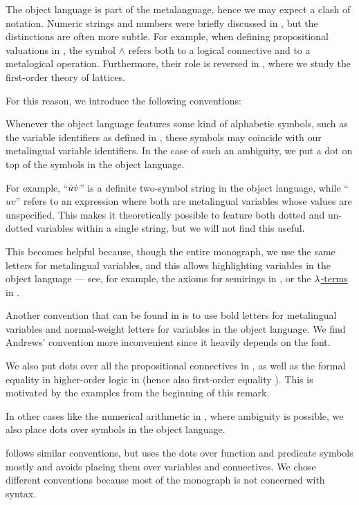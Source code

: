 \begin{remark}\label{rem:object_language_dots}
  The object language is part of the metalanguage, hence we may expect a clash of notation. Numeric strings and numbers were briefly discussed in , but the distinctions are often more subtle. For example, when defining propositional valuations in , the symbol \( \wedge \) refers both to a logical connective and to a metalogical operation. Furthermore, their role is reversed in , where we study the first-order theory of lattices.

  For this reason, we introduce the following conventions:
  \begin{thmenum}
     Whenever the object language features some kind of alphabetic symbols, such as the variable identifiers as defined in , these symbols may coincide with our metalingual variable identifiers. In the case of such an ambiguity, we put a dot on top of the symbols in the object language.

    For example, \enquote{\( \dot{u} \dot{v} \)} is a definite two-symbol string in the object language, while \enquote{\( uv \)} refers to an expression where both are metalingual variables whose values are unspecified. This makes it theoretically possible to feature both dotted and un-dotted variables within a single string, but we will not find this useful.

    This becomes helpful because, though the entire monograph, we use the same letters for metalingual variables, and this allows highlighting variables in the object language --- see, for example, the axioms for semirings in , or the \hyperref[def:lambda_term]{\( {\mathrm \lambda} \)-terms} in .

    Another convention that can be found in \cite[\S 51]{Andrews2002Logic} is to use bold letters for metalingual variables and normal-weight letters for variables in the object language. We find Andrews' convention more inconvenient since it heavily depends on the font.

     We also put dots over all the propositional connectives in , as well as the formal equality in higher-order logic in  (hence also first-order equality ). This is motivated by the examples from the beginning of this remark.

     In other cases like the numerical arithmetic in , where ambiguity is possible, we also place dots over symbols in the object language.
  \end{thmenum}

   follows similar conventions, but uses the dots over function and predicate symbols mostly and avoids placing them over variables and connectives. We chose different conventions because most of the monograph is not concerned with syntax.
\end{remark}

